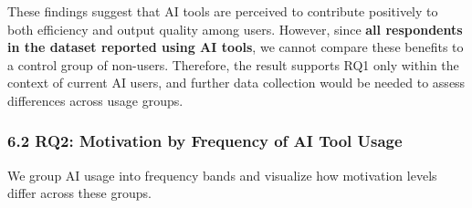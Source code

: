 \documentclass[
]{article}
\begin{document}
These findings suggest that AI tools are perceived to contribute
positively to both efficiency and output quality among users. However,
since \textbf{all respondents in the dataset reported using AI tools},
we cannot compare these benefits to a control group of non-users.
Therefore, the result supports RQ1 only within the context of current AI
users, and further data collection would be needed to assess differences
across usage groups.

\subsubsection{6.2 RQ2: Motivation by Frequency of AI Tool
Usage}\label{rq2-motivation-by-frequency-of-ai-tool-usage}

We group AI usage into frequency bands and visualize how motivation
levels differ across these groups.
\end{document}
